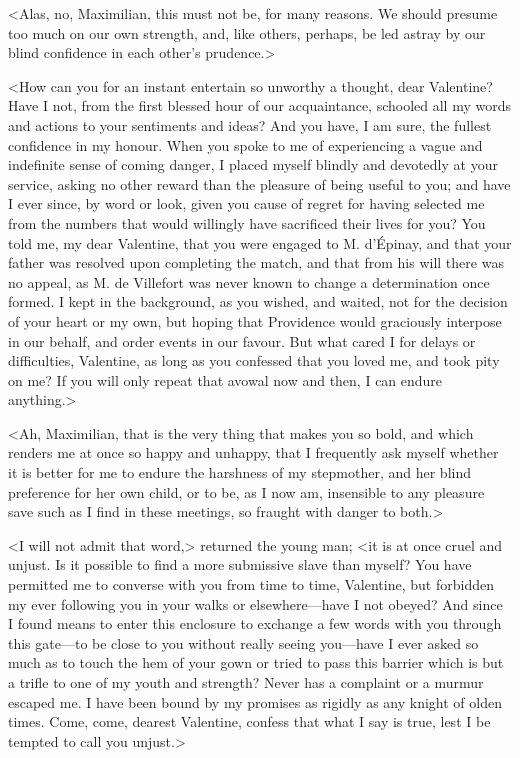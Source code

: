  <Alas, no, Maximilian, this must not be, for many reasons. We should presume too much on our own strength, and, like others, perhaps, be led astray by our blind confidence in each other's prudence.> 

 <How can you for an instant entertain so unworthy a thought, dear Valentine? Have I not, from the first blessed hour of our acquaintance, schooled all my words and actions to your sentiments and ideas? And you have, I am sure, the fullest confidence in my honour. When you spoke to me of experiencing a vague and indefinite sense of coming danger, I placed myself blindly and devotedly at your service, asking no other reward than the pleasure of being useful to you; and have I ever since, by word or look, given you cause of regret for having selected me from the numbers that would willingly have sacrificed their lives for you? You told me, my dear Valentine, that you were engaged to M. d'Épinay, and that your father was resolved upon completing the match, and that from his will there was no appeal, as M. de Villefort was never known to change a determination once formed. I kept in the background, as you wished, and waited, not for the decision of your heart or my own, but hoping that Providence would graciously interpose in our behalf, and order events in our favour. But what cared I for delays or difficulties, Valentine, as long as you confessed that you loved me, and took pity on me? If you will only repeat that avowal now and then, I can endure anything.> 

 <Ah, Maximilian, that is the very thing that makes you so bold, and which renders me at once so happy and unhappy, that I frequently ask myself whether it is better for me to endure the harshness of my stepmother, and her blind preference for her own child, or to be, as I now am, insensible to any pleasure save such as I find in these meetings, so fraught with danger to both.> 

 <I will not admit that word,> returned the young man; <it is at once cruel and unjust. Is it possible to find a more submissive slave than myself? You have permitted me to converse with you from time to time, Valentine, but forbidden my ever following you in your walks or elsewhere—have I not obeyed? And since I found means to enter this enclosure to exchange a few words with you through this gate—to be close to you without really seeing you—have I ever asked so much as to touch the hem of your gown or tried to pass this barrier which is but a trifle to one of my youth and strength? Never has a complaint or a murmur escaped me. I have been bound by my promises as rigidly as any knight of olden times. Come, come, dearest Valentine, confess that what I say is true, lest I be tempted to call you unjust.>

